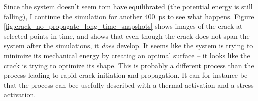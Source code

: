 Since the system doesn't seem tom have equilibrated (the potential energy is still falling), I continue the simulation for another \SI{400}{\pico\second} to see what happens. Figure \ref{fig:crack_no_propagate_long_time_snapshots} shows images of the crack at selected points in time, and shows that even though the crack does not span the system after the simulations, it \emph{does} develop. It seems like the system is trying to minimize its mechanical energy by creating an optimal surface -- it looks like the crack is trying to optimize its shape. This is probably a different process than the process leading to rapid crack initiation and propagation. It can for instance be that the process can bee usefully described with a thermal activation and a stress activation. 

\begin{figure}
\begin{minipage}[b]{0.24\linewidth}
\end{minipage}

\end{figure}
